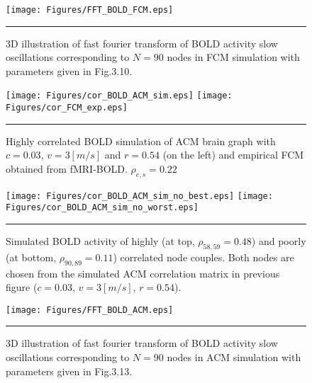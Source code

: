 \begin{figure}[htbp]
 
  \centering
	 \texttt{[image: Figures/FFT\_BOLD\_FCM.eps]} 

    \rule{35em}{0.5pt}
  \caption[3D Fourier Transform, BOLD, FCM]{3D illustration of fast fourier transform of BOLD activity slow oscillations corresponding to $N=90$ nodes in FCM simulation with parameters given in Fig.3.10.} 
    \label{fig:3D Fourier Transform, BOLD, FCM}
 	
\end{figure}  


\begin{figure}[htbp]
 
  \centering
	 \texttt{[image: Figures/cor\_BOLD\_ACM\_sim.eps]} 
   	 \texttt{[image: Figures/cor\_FCM\_exp.eps]} 

    \rule{35em}{0.5pt}
  \caption[Best correlated BOLD simulation, ACM]{Highly correlated BOLD simulation of ACM brain graph with $c=0.03$, $v=3 [m/s]$ and $r=0.54$ (on the left) and empirical FCM obtained from fMRI-BOLD. $\rho_{e,s} = 0.22$} 
    \label{fig:Best correlated BOLD simulation, ACM}
 	
\end{figure}  




\begin{figure}[htbp]
 
  \centering
	 \texttt{[image: Figures/cor\_BOLD\_ACM\_sim\_no\_best.eps]} 
   	 \texttt{[image: Figures/cor\_BOLD\_ACM\_sim\_no\_worst.eps]} 

    \rule{35em}{0.5pt}
  \caption[BOLD Activity Node Dynamics, ACM]{Simulated BOLD activity of highly (at top, $\rho_{58,59}=0.48$) and poorly (at bottom, $\rho_{90,89}=0.11$) correlated node couples. Both nodes are chosen from the simulated ACM correlation matrix in previous figure ($c=0.03$, $v=3 [m/s]$, $r=0.54$).} 
    \label{fig:BOLD Activity Node Dynamics, ACM}
 	
\end{figure} 





\begin{figure}[htbp]
 
  \centering
	 \texttt{[image: Figures/FFT\_BOLD\_ACM.eps]} 

    \rule{35em}{0.5pt}
  \caption[3D Fourier Transform, BOLD, ACM]{3D illustration of fast fourier transform of BOLD activity slow oscillations corresponding to $N=90$ nodes in ACM simulation with parameters given in Fig.3.13.} 
    \label{fig:3D Fourier Transform, BOLD, ACM}
 	
\end{figure}  







